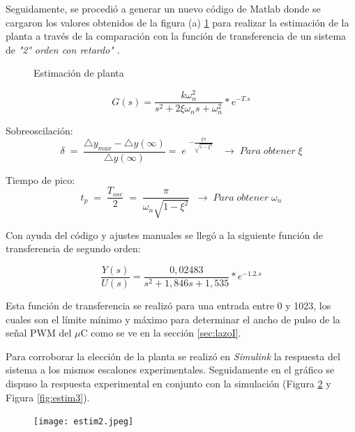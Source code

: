     Seguidamente, se procedió a generar un nuevo código de Matlab donde se cargaron los valores obtenidos de la figura (a) \ref{fig:pl2} para realizar la estimación de la planta a través de la comparación con la función de transferencia de un sistema de \textit{"2° orden con retardo"} \cite{pomares2011sistemas}.
    
    \begin{figure}[H]
    	\centering
    	\caption{Estimación de planta} \label{fig:pl2}
    \end{figure}

 \begin{equation}
 	G(s)=\frac{k\omega_n^2}{s^2+2\xi\omega_ns+\omega_n^2}\ast e^{-T.s}
 \end{equation}

Sobreoscilación: 
\begin{equation}
	\delta\;=\;\frac{\triangle y_{max}-\triangle y\left(\infty\right)}{\triangle y\left(\infty\right)}=\;e\;^{-\frac{\xi\pi}{\sqrt{1-\xi^2}}}\;\;\;\rightarrow\;Para\;obtener\;\xi
\end{equation}

Tiempo de pico: 
\begin{equation}
t_p\;=\;\frac{T_{osc}}2\;=\;\frac\pi{\omega_n\sqrt{1-\xi^2}}\;\;\rightarrow\;Para\;obtener\;\omega_n
\end{equation}

    
    Con ayuda del código y ajustes manuales se llegó a la siguiente función de transferencia de segundo orden:
    
    \begin{equation}
    	\frac{Y(s)}{U(s)}=\frac{0,02483}{s^2+1,846s+1,535}*e^{-1.2.s}
    \end{equation}
   
    Esta función de transferencia se realizó para una entrada entre 0 y 1023, los cuales son el límite mínimo y máximo para determinar el ancho de pulso de la señal PWM del $\mu$C como se ve en la sección \ref{sec:lazoI}.
    
    Para corroborar la elección de la planta se realizó en \textit{Simulink} la respuesta del sistema a los mismos escalones experimentales. Seguidamente en el gráfico se dispuso la respuesta experimental en conjunto con la simulación (Figura \ref{fig:estim2} y Figura \ref{fig:estim3}).
    
    \begin{figure}[H]
    	\centering
    	\texttt{[image: estim2.jpeg]}
    	\label{fig:estim2}
    \end{figure}

